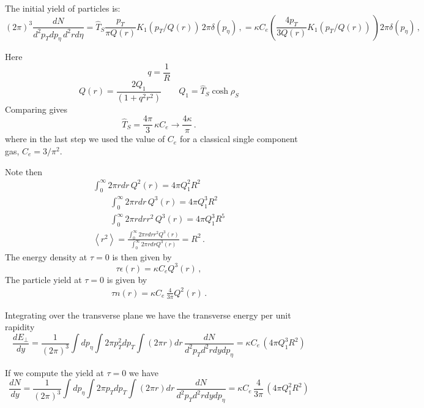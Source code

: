 \documentclass[12pt,aps,preprint,nofootinbib,noshowkeys,noshowpacs,longbibliography,superscriptaddress,tightenlines]{revtex4-2}
\def\Kinf{\kappa}
\def\llangle{\left\langle}
\def\rrangle{\right\rangle}
\begin{document}
The initial yield of particles is: 
\begin{equation}
  (2\pi)^3 \frac{dN}{d^2 p_T dp_\eta \, d^2r  d\eta } =   \hat{T}_S \frac{p_T}{\pi Q(r)} K_1(p_T /Q(r))\,    2\pi \delta(p_{\eta})\, ,
 =  \Kinf C_e \left( \frac{4p_T}{3 Q(r)} K_1(p_T /Q(r))\, \right)    2\pi \delta(p_{\eta})  \, ,
\end{equation}



Here  
\begin{equation}
  q= \frac{1}{R} 
\end{equation}
\begin{equation}
  \boxed{
  Q(r) = \frac{2 Q_1}{(1 + q^2 r^2)}   \qquad  Q_1= \hat{T}_S \cosh\rho_S
  }
\end{equation}
Comparing gives 
\begin{equation}
\boxed{
\hat{T}_S = \frac{4 \pi}{3} \, \Kinf C_e \rightarrow \frac{4 \Kinf}{\pi} \, .
}
\end{equation}
where in the last step we used the value of $C_e$ for a classical single component gas, $C_e = 3/\pi^2$.

Note then 
 \begin{gather}
 \int_0^\infty 2\pi r dr \, Q^2(r) = 4 \pi Q_1^2 R^2 \\
 \qquad \int_0^\infty 2\pi r dr \, Q^3(r) = 4 \pi Q_1^3 R^2 \\
 \qquad \int_0^\infty 2\pi r dr r^2 \, Q^3(r) = 4 \pi Q_1^3 R^5 \\
\llangle r^2 \rrangle = \frac{\int_0^\infty 2\pi r dr r^2 Q^3(r)}{\int_0^\infty 2\pi r dr Q^3(r)} = R^2 \, .
 \end{gather}
The energy density at $\tau=0$ is then given by
\begin{equation}
\tau \epsilon(r) = \Kinf C_eQ^3(r) \, ,
\end{equation}
The particle yield at $\tau=0$ is given by
\begin{eqnarray}
  \tau n(r) = \Kinf C_e\, \frac{4}{3\pi} Q^2(r) \, .
\end{eqnarray}


Integrating over the transverse plane we have the transverse energy per unit rapidity
\begin{equation}
\frac{dE_\perp}{dy} = \frac{1}{(2\pi)^3} \int dp_{\eta} \int 2\pi p_T^2 dp_T \int (2\pi r) dr \,  \frac{dN}{d^2 p_T d^2r  dy dp_{\eta} } =  \Kinf C_e\,    (4\pi Q_1^3  R^2)
\end{equation}

If we compute the yield at $\tau=0$ we have
\begin{equation}
\frac{dN}{dy} = \frac{1}{(2\pi)^3} \int dp_{\eta} \int 2\pi p_T dp_T \int (2\pi r) dr \, \frac{dN}{d^2 p_T d^2r  dy dp_{\eta} } =  
\Kinf C_e\, \frac{4}{3\pi}   \,   (4 \pi Q_1^2  R^2)
\end{equation}
  
\end{document}
